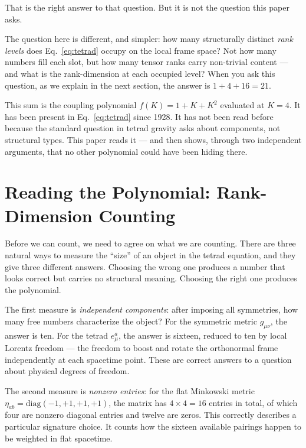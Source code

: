 \documentclass[a4paper,11pt]{article}
\begin{document}
That is the right answer to that question. But it is not
the question this paper asks.

The question here is different, and simpler: how many
structurally distinct \emph{rank levels} does
Eq.~\eqref{eq:tetrad} occupy on the local frame space?
Not how many numbers fill each slot, but how many tensor
ranks carry non-trivial content --- and what is the
rank-dimension at each occupied level? When you ask this
question, as we explain in the next section, the answer
is $1 + 4 + 16 = 21$.

This sum is the coupling polynomial $f(K) = 1 + K + K^2$
evaluated at $K = 4$. It has been present in
Eq.~\eqref{eq:tetrad} since 1928. It has not been read
before because the standard question in tetrad gravity
asks about components, not structural types. This paper
reads it --- and then shows, through two independent
arguments, that no other polynomial could have been
hiding there.


\section{Reading the Polynomial: Rank-Dimension Counting}

Before we can count, we need to agree on what we are
counting. There are three natural ways to measure the
``size'' of an object in the tetrad equation, and they
give three different answers. Choosing the wrong one
produces a number that looks correct but carries no
structural meaning. Choosing the right one produces the
polynomial.

The first measure is \emph{independent components}: after
imposing all symmetries, how many free numbers characterize
the object? For the symmetric metric $g_{\mu\nu}$, the
answer is ten. For the tetrad $e^a_\mu$, the answer is
sixteen, reduced to ten by local Lorentz freedom --- the
freedom to boost and rotate the orthonormal frame
independently at each spacetime point. These are correct answers to a question about
physical degrees of freedom.

The second measure is \emph{nonzero entries}: for the flat
Minkowski metric $\eta_{ab} = \mathrm{diag}(-1,+1,+1,+1)$,
the matrix has $4 \times 4 = 16$ entries in total, of which
four are nonzero diagonal entries and twelve are zeros.
This correctly describes a particular signature choice.
It counts how the sixteen available pairings happen to be
weighted in flat spacetime.
\end{document}
